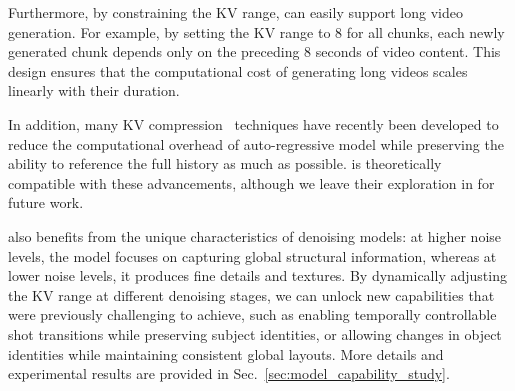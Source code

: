 Furthermore, by constraining the KV range, \magi can easily support long video generation. For example, by setting the KV range to 8 for all chunks, each newly generated chunk depends only on the preceding 8 seconds of video content. This design ensures that the computational cost of generating long videos scales linearly with their duration.

In addition, many KV compression~\citep{hooper2024kvquant,xiao2023efficient,sheng2023flexgen} techniques have recently been developed to reduce the computational overhead of auto-regressive model while preserving the ability to reference the full history as much as possible. \magi is theoretically compatible with these advancements, although we leave their exploration in \magi for future work.

\magi also benefits from the unique characteristics of denoising models: at higher noise levels, the model focuses on capturing global structural information, whereas at lower noise levels, it produces fine details and textures. By dynamically adjusting the KV range at different denoising stages, we can unlock new capabilities that were previously challenging to achieve, such as enabling temporally controllable shot transitions while preserving subject identities, or allowing changes in object identities while maintaining consistent global layouts. More details and experimental results are provided in Sec.~\ref{sec:model_capability_study}.


